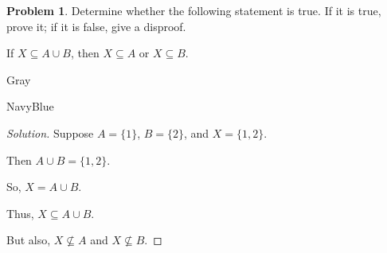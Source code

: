 \documentclass[12pt]{amsart}
\newcounter{problem_number}[section]
\theoremstyle{named}
\newenvironment{soln}
{\begin{color}{Gray}\begin{framed}\begin{color}{NavyBlue}\begin{proof}[Solution]
\doublespacing}
{\end{proof}\end{color}\end{framed}\end{color}}
\theoremstyle{definition}
\newtheorem{problem}[proposition]{Problem}
\begin{document}
\phantom{ }

\phantom{ }

\phantom{ }

\phantom{ }
\begin{problem}
	Determine whether the following statement is true.
	If it is true, prove it; if it is false, give a disproof.
	\begin{center}
		If $X\subseteq A\cup B$, then $X\subseteq A$ or $X\subseteq B$.
	\end{center}
\end{problem}

\begin{soln}
	\phantom{ }

	Suppose $A = \{1\}$, $B = \{2\}$, and $X = \{1,2\}$.

	Then $A \cup B = \{1, 2\}$.

	So, $X = A \cup B$.

	Thus, $X \subseteq A \cup B$.

	But also, $X \nsubseteq A$ and $X \nsubseteq B$.
\end{soln}
\end{document}
